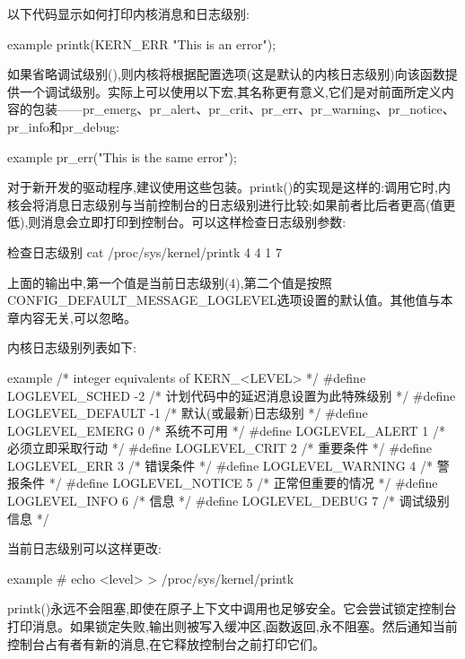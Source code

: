\documentclass[lang=cn,newtx,10pt,scheme=chinese]{elegantbook}
\begin{document}
以下代码显示如何打印内核消息和日志级别:

\begin{mycode}{example}
    printk(KERN_ERR "This is an error\n");
\end{mycode}

如果省略调试级别(),则内核将根据\break{}配置选项(这是默认的内核日志级别)向该函数提供一个调试级别。实际上可以使用以下宏,其名称更有意义,它们是对前面所定义内容的包装——pr\_emerg、pr\_alert、pr\_crit、pr\_err、pr\_warning、pr\_notice、pr\_info和pr\_debug:

\begin{mycode}{example}
    pr_err("This is the same error\n");
\end{mycode}

对于新开发的驱动程序,建议使用这些包装。printk()的实现是这样的:调用它时,内核会将消息日志级别与当前控制台的日志级别进行比较;如果前者比后者更高(值更低),则消息会立即打印到控制台。可以这样检查日志级别参数:

\begin{mycode}{检查日志级别}
    cat /proc/sys/kernel/printk
    4 4 1 7
\end{mycode}

上面的输出中,第一个值是当前日志级别(4),第二个值是按照CONFIG\_DEFAULT\_MESSAGE\_LOGLEVEL选项设置的默认值。其他值与本章内容无关,可以忽略。

内核日志级别列表如下:

\begin{mycode}{example}
/* integer equivalents of KERN_<LEVEL> */
#define LOGLEVEL_SCHED   -2 /* 计划代码中的延迟消息设置为此特殊级别 */
#define LOGLEVEL_DEFAULT -1 /* 默认(或最新)日志级别 */
#define LOGLEVEL_EMERG    0 /* 系统不可用 */
#define LOGLEVEL_ALERT    1 /* 必须立即采取行动 */
#define LOGLEVEL_CRIT     2 /* 重要条件 */
#define LOGLEVEL_ERR      3 /* 错误条件 */
#define LOGLEVEL_WARNING  4 /* 警报条件 */
#define LOGLEVEL_NOTICE   5 /* 正常但重要的情况 */
#define LOGLEVEL_INFO     6 /* 信息 */
#define LOGLEVEL_DEBUG    7 /* 调试级别信息 */
\end{mycode}

当前日志级别可以这样更改:

\begin{mycode}{example}
# echo <level> > /proc/sys/kernel/printk
\end{mycode}

\begin{marker}
printk()永远不会阻塞,即使在原子上下文中调用也足够安全。它会尝试锁定控制台打印消息。如果锁定失败,输出则被写入缓冲区,函数返回,永不阻塞。然后通知当前控制台占有者有新的消息,在它释放控制台之前打印它们。
\end{marker}
\end{document}

